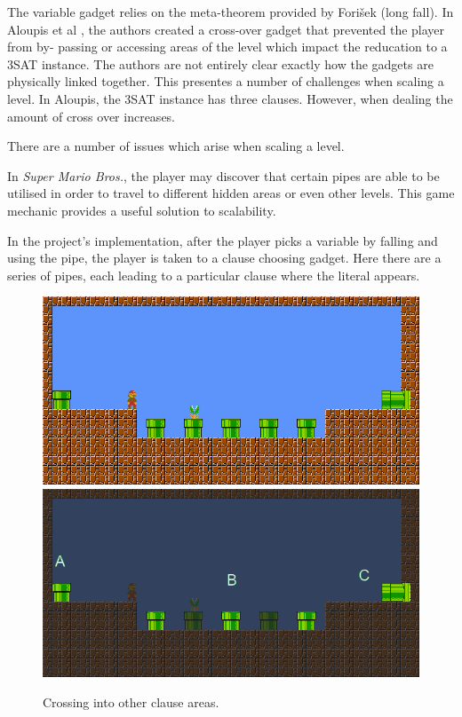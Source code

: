 \documentclass[11pt, a4paper, oneside]{report} %
\begin{document}
The variable gadget relies on the meta-theorem provided by Fori\v{s}ek
\cite{DBLP:conf/fun/Forisek10} (long fall). In Aloupis et al \cite{Aloupis2012},
the authors created a cross-over gadget that prevented the player from by-
passing or accessing areas of the level which impact the reducation to a 3SAT
instance. The authors are not entirely clear exactly how the gadgets are
physically linked together. This presentes a number of challenges when scaling a
level. In Aloupis, the 3SAT instance has three clauses. However, when dealing
the amount of cross over increases.

There are a number of issues which arise when scaling a level.

In \textit{Super Mario Bros.}, the player may discover that certain pipes are
able to be utilised in order to travel to different hidden areas or even other
levels. This game mechanic provides a useful solution to scalability.

In the project's implementation, after the player picks a variable by falling
and using the pipe, the player is taken to a clause choosing gadget. Here there
are a series of pipes, each leading to a particular clause where the literal
appears.

\begin{figure}[ht!]

  \centering
    \includegraphics[scale=0.70]{clause}
    \includegraphics[scale=0.70]{clause-explain}
  \caption{Crossing into other clause areas.}
  \label{clause-crossing}
\end{figure}
\end{document}
